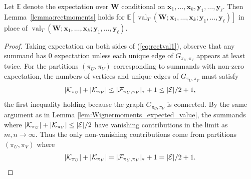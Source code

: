 \documentclass[10pt,reqno]{amsart}
\def\x{\mathbf{x}}
\def\y{\mathbf{y}}
\def\W{\mathbf{W}}
\def\E{\mathbb{E}}
\def\cE{\mathcal{E}}
\def\val{\operatorname{val}}
\begin{document}
\begin{lemma}\label{lemma:Erectmoments}
Let $\E$ denote the expectation over $\W$ conditional on
$\x_1,\ldots,\x_k,\y_1,\ldots,\y_\ell$. Then Lemma~\ref{lemma:rectmoments} holds for
$\E[\val_T(\W;\x_1,\ldots,\x_k;\y_1,\ldots,\y_\ell)]$ in place of
$\val_T(\W;\x_1,\ldots,\x_k;\y_1,\ldots,\y_\ell)$.
\end{lemma}
\begin{proof}
Taking expectation on both sides of (\ref{eq:rectval1}), observe that any
summand has 0 expectation unless each unique edge of $G_{\pi_U,\pi_V}$ appears
at least twice. For the partitions $(\pi_U,\pi_V)$ corresponding to
summands with non-zero expectation, the numbers
of vertices and unique edges of $G_{\pi_U,\pi_V}$ must satisfy
\[|\cK_{\pi_U}|+|\cK_{\pi_V}| \leq |\cF_{\pi_U,\pi_V}|_*+1 \leq |\cE|/2+1,\]
the first inequality holding because the graph $G_{\pi_U,\pi_V}$ is connected.
By the same argument as in Lemma \ref{lem:Wignermoments_expected_value},
the summands where
$|\cK_{\pi_U}|+|\cK_{\pi_V}| \leq |\cE|/2$ have vanishing
contributions in the limit as $m,n \to \infty$. Thus the only non-vanishing
contributions come from partitions $(\pi_U,\pi_V)$ where
\begin{equation}\label{eq:rectnonvanishing}
|\cK_{\pi_U}|+|\cK_{\pi_V}|=|\cF_{\pi_U,\pi_V}|_*+1=|\cE|/2+1.
\end{equation}


\end{proof}
\end{document}
